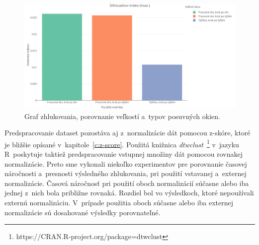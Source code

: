 \documentclass[a4paper,twoside,slovak,12pt,appendix]{article}
\begin{document}
\begin{figure}[htbp]
  \centering
  \includegraphics[width=\textwidth]{cvi/window_comparison/201903072017-Sil-window_comparison.png}
  \caption{Graf zhlukovania, porovnanie veľkostí a~typov posuvných okien.}
	\label{fig:cvi-window-sil}
\end{figure}

Predspracovanie dataset pozostáva aj z~normalizácie dát pomocou z-skóre, ktoré
je bližšie opísané v~kapitole~\ref{c:z-score}. Použitá knižnica
\textit{dtwclust}~\footnote{https://CRAN.R-project.org/package=dtwclust}
v~jazyku R~poskytuje taktiež predspracovanie vstupnej množiny dát pomocou
rovnakej normalizácie. Preto sme vykonali niekoľko experimentov pre porovnanie
časovej náročnosti a~presnosti výsledného zhlukovania, pri použití vstavanej
a~externej normalizácie. Časová náročnosť pri použití oboch normalizácií súčasne
alebo iba jednej z~nich bola približne rovnaká. Rozdiel bol vo výsledkoch, ktoré
nepoužívali externú normalizáciu. V~prípade použitia oboch súčasne alebo iba
externej normalizácie sú dosahované výsledky porovnateľné.


\newpage


\newpage\null\thispagestyle{empty}\newpage

\end{document}
